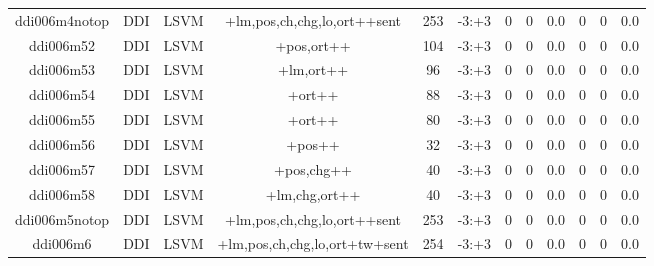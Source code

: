 \documentclass[a4paper]{article}
\begin{document}
\begin{landscape}
\begin{center}
\begin{tabular}{ |c|c|c|c|c|c|c|c|c|c|c|c|}
 
 	
 	\small{ ddi006m4notop } & \small{ DDI} & \small{  LSVM }  & +lm,pos,ch,chg,lo,ort++sent  &  253 &  \small{  -3:+3 }  &  0 & 0 & 0.0  &  0 & 0 & 0.0 \\
 	

 
 	
 	\small{ ddi006m52 } & \small{ DDI} & \small{  LSVM }  & +pos,ort++  &  104 &  \small{  -3:+3 }  &  0 & 0 & 0.0  &  0 & 0 & 0.0 \\
 	

 
 	
 	\small{ ddi006m53 } & \small{ DDI} & \small{  LSVM }  & +lm,ort++  &  96 &  \small{  -3:+3 }  &  0 & 0 & 0.0  &  0 & 0 & 0.0 \\
 	

 
 	
 	\small{ ddi006m54 } & \small{ DDI} & \small{  LSVM }  & +ort++  &  88 &  \small{  -3:+3 }  &  0 & 0 & 0.0  &  0 & 0 & 0.0 \\
 	

 
 	
 	\small{ ddi006m55 } & \small{ DDI} & \small{  LSVM }  & +ort++  &  80 &  \small{  -3:+3 }  &  0 & 0 & 0.0  &  0 & 0 & 0.0 \\
 	

 
 	
 	\small{ ddi006m56 } & \small{ DDI} & \small{  LSVM }  & +pos++  &  32 &  \small{  -3:+3 }  &  0 & 0 & 0.0  &  0 & 0 & 0.0 \\
 	

 
 	
 	\small{ ddi006m57 } & \small{ DDI} & \small{  LSVM }  & +pos,chg++  &  40 &  \small{  -3:+3 }  &  0 & 0 & 0.0  &  0 & 0 & 0.0 \\
 	

 
 	
 	\small{ ddi006m58 } & \small{ DDI} & \small{  LSVM }  & +lm,chg,ort++  &  40 &  \small{  -3:+3 }  &  0 & 0 & 0.0  &  0 & 0 & 0.0 \\
 	

 
 	
 	\small{ ddi006m5notop } & \small{ DDI} & \small{  LSVM }  & +lm,pos,ch,chg,lo,ort++sent  &  253 &  \small{  -3:+3 }  &  0 & 0 & 0.0  &  0 & 0 & 0.0 \\
 	

 
 	
 	\small{ ddi006m6 } & \small{ DDI} & \small{  LSVM }  & +lm,pos,ch,chg,lo,ort+tw+sent  &  254 &  \small{  -3:+3 }  &  0 & 0 & 0.0  &  0 & 0 & 0.0 \\
 	


\end{tabular}
\end{center}
\end{landscape}
\end{document}
